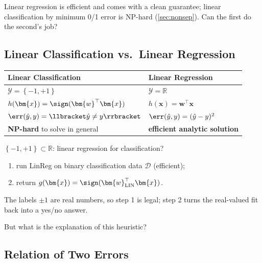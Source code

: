 
Linear regression is efficient and comes with a clean guarantee; linear
classification by minimum 0/1 error is NP-hard (\autoref{sec:nonsep}). Can the
first do the second's job?

\subsection{Linear Classification vs.\ Linear Regression}

\begin{center}
    \solidrules
    \begin{tabular}{@{}l|l@{}}
        \toprule
        \textbf{Linear Classification} & \textbf{Linear Regression}\\
        \midrule
        \(\mathcal{Y} = \left\{ -1, +1 \right\}\) & \(\mathcal{Y} =
        \mathbb{R}\)\\
        \(h(\bm{x}) = \sign(\bm{w}^\top \bm{x})\) & \(h(\bm{x}) = \bm{w}^\top
        \bm{x}\)\\
        \(\err(\hat{y}, y) = \llbracket \hat{y} \neq y \rrbracket\) &
        \(\err(\hat{y}, y) = (\hat{y} - y)^2\)\\
        \textcolor{orange!85!black}{\textbf{NP-hard}} to solve in general &
        \textcolor{orange!85!black}{\textbf{efficient analytic solution}}\\
        \bottomrule
    \end{tabular}
\end{center}

\(\left\{ -1, +1 \right\} \subset \mathbb{R}\): linear regression for
classification?

\begin{enumerate}
    \item run LinReg on binary classification data \(\mathcal{D}\)
        (\textcolor{orange!85!black}{efficient});
    \item return \(g(\bm{x}) = \sign(\bm{w}_{\mathrm{LIN}}^\top \bm{x})\).
\end{enumerate}

The labels \(\pm 1\) are real numbers, so step 1 is legal; step 2 turns the
real-valued fit back into a yes/no answer.

\begin{question}
    But what is the explanation of this heuristic?
\end{question}

\subsection{Relation of Two Errors}

